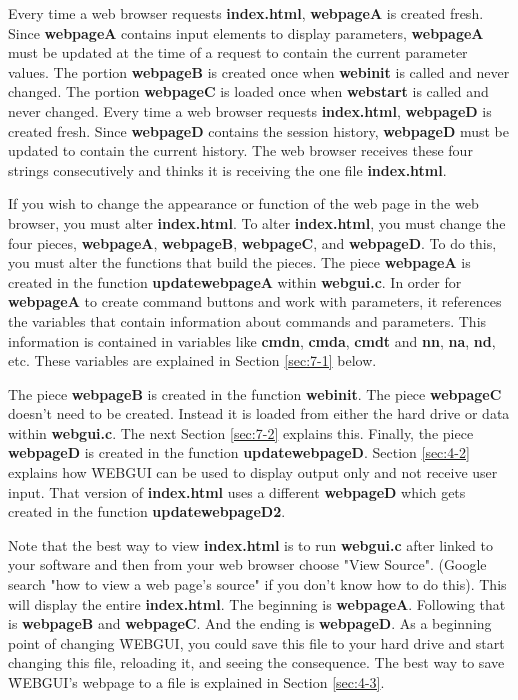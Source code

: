 Every time a web browser requests \textbf{index.html}, \textbf{webpageA} is created fresh. Since \textbf{webpageA} contains
input elements to display parameters, \textbf{webpageA} must be updated at the time of a request to contain the current
parameter values. The portion \textbf{webpageB} is created once when \textbf{webinit} is called and never changed.
The portion \textbf{webpageC} is loaded once when \textbf{webstart} is called and never changed. Every time a web
browser requests \textbf{index.html}, \textbf{webpageD} is created fresh. Since \textbf{webpageD} contains the session 
history, \textbf{webpageD} must be updated to contain the current history. The web browser receives these four strings
consecutively and thinks it is receiving the one file \textbf{index.html}.

If you wish to change the appearance or function of the web page in the web browser, you must alter \textbf{index.html}.
To alter \textbf{index.html}, you must change the four pieces,  \textbf{webpageA}, \textbf{webpageB}, \textbf{webpageC}, 
and \textbf{webpageD}. To do this, you must alter the functions that build the pieces.
The piece \textbf{webpageA} is created in the function \textbf{updatewebpageA} within \textbf{webgui.c}.
In order for \textbf{webpageA} to create command buttons and work with parameters, it references the variables that 
contain information about commands and parameters. This information is contained in variables like \textbf{cmdn},
\textbf{cmda}, \textbf{cmdt} and \textbf{nn}, \textbf{na}, \textbf{nd}, etc. These variables are explained in Section \ref{sec:7-1}
below. 

The piece \textbf{webpageB} is created in the function \textbf{webinit}. The piece \textbf{webpageC} doesn't need to be created.
Instead it is loaded from either the hard drive or data within \textbf{webgui.c}. The next Section \ref{sec:7-2} explains this.
Finally, the piece \textbf{webpageD} is created in the function \textbf{updatewebpageD}. Section \ref{sec:4-2} explains how
\f{WEBGUI} can be used to display output only and not receive user input. That version of \textbf{index.html} uses a different
\textbf{webpageD} which gets created in the function \textbf{updatewebpageD2}.

Note that the best way to view \textbf{index.html} is to run \textbf{webgui.c} after linked to your software and then from your
web browser choose "View Source". (Google search "how to view a web page's source" if you don't know how to do this).
This will display the entire \textbf{index.html}. The beginning is \textbf{webpageA}. Following that is \textbf{webpageB} and 
\textbf{webpageC}. And the ending is \textbf{webpageD}. As a beginning point
of changing \f{WEBGUI}, you could save this file to your hard drive and start changing this file, reloading it, and seeing the consequence.
The best way to save \f{WEBGUI}'s webpage to a file is explained in Section \ref{sec:4-3}.


